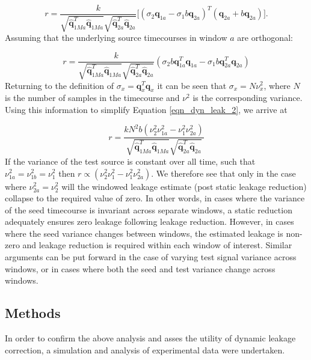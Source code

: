 \begin{equation}
r = \frac{k}{\sqrt{\hat{\mathbf{q}}_{1Ma}^T\hat{\mathbf{q}}_{1Ma}}\sqrt{\hat{\mathbf{q}}_{2a}^T\hat{\mathbf{q}}_{2a}}}\big[(\sigma_2 \mathbf{q}_{1a}-\sigma_1b\mathbf{q}_{2a})^T(\mathbf{q}_{2a}+b\mathbf{q}_{2a})\big].
\end{equation} Assuming that the underlying source timecourses in window $a$ are orthogonal:

\begin{equation}
r = \frac{k}{\sqrt{\hat{\mathbf{q}}_{1Ma}^T\hat{\mathbf{q}}_{1Ma}}\sqrt{\hat{\mathbf{q}}_{2a}^T\hat{\mathbf{q}}_{2a}}}(\sigma_2b\mathbf{q}_{1a}^T\mathbf{q}_{1a}-\sigma_1b\mathbf{q}_{2a}^T\mathbf{q}_{2a})
\label{eqn_dyn_leak_2}
\end{equation} Returning to the definition of $\sigma_x = \mathbf{q}_x^T\mathbf{q}_x$ it can be seen that  $\sigma_x = N\nu_x^2$, where $ N $ is the number of samples in the timecourse and $\nu^2$ is the corresponding variance. Using this information to simplify Equation \ref{eqn_dyn_leak_2}, we arrive at

\begin{equation}
r = \frac{kN^2b(\nu^2_2\nu^2_{1a}-\nu^2_1\nu^2_{2a})}{{\sqrt{\hat{\mathbf{q}}_{1Ma}^T\hat{\mathbf{q}}_{1Ma}}\sqrt{\hat{\mathbf{q}}_{2a}^T\hat{\mathbf{q}}_{2a}}}}
\end{equation} If the variance of the test source is constant over all time, such that $\nu^2_{1a}=\nu^2_{1b}=\nu^2_{1}$ then $r\propto(\nu^2_2\nu^2_{1}-\nu^2_1\nu^2_{2a})$. We therefore see that only in the case where $\nu_{2a}^2=\nu_2^2$ will the windowed leakage estimate (post static leakage reduction) collapse to the required value of zero. In other words, in cases where the variance of the seed timecourse is invariant across separate windows, a static reduction adequately ensures zero leakage following leakage reduction. However, in cases where the seed variance changes between windows, the estimated leakage is non-zero and leakage reduction is required within each window of interest. Similar arguments can be put forward in the case of varying test signal variance across windows, or in cases where both the seed and test variance change across windows. 

\subsection{Methods}
In order to confirm the above analysis and asses the utility of dynamic leakage correction, a simulation and analysis of experimental data were undertaken. 

